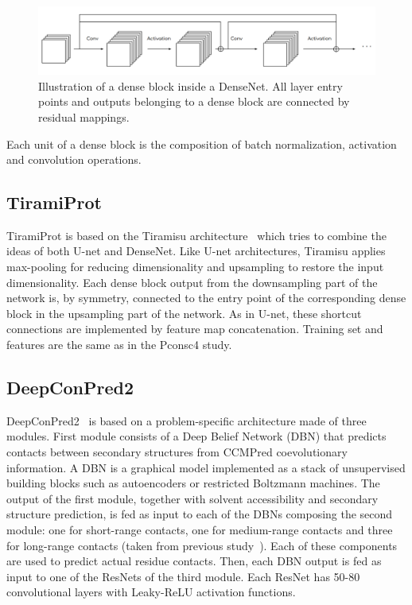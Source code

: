         \begin{figure}[H]
            \begin{center}
                \includegraphics[width=\textwidth, keepaspectratio]{imgs/densenet.png}
                \caption{Illustration of a dense block inside a DenseNet.
                All layer entry points and outputs belonging to a dense block are connected
                by residual mappings.}
                \label{densenet}
            \end{center}
        \end{figure}

        Each unit of a dense block is the composition of batch normalization, activation and
        convolution operations.

    \subsection{TiramiProt}

        TiramiProt is based on the Tiramisu architecture~\cite{TsardakasRenhuldt1228846}
        which tries to combine the ideas of both U-net and DenseNet.
        Like U-net architectures, Tiramisu applies max-pooling for reducing dimensionality
        and upsampling to restore the input dimensionality. Each dense block output from
        the downsampling part of the network is, by symmetry, connected to the entry point
        of the corresponding dense block in the upsampling part of the network.
        As in U-net, these shortcut connections are implemented by feature map concatenation.
        Training set and features are the same as in the Pconsc4 study.

    \subsection{DeepConPred2}

        DeepConPred2~\cite{DeepConPred2} is based on a problem-specific architecture made
        of three modules. First module consists of a Deep Belief Network (DBN) that predicts
        contacts between secondary structures from CCMPred coevolutionary information.
        A DBN is a graphical model implemented as
        a stack of unsupervised building blocks such as autoencoders or
        restricted Boltzmann machines.
        The output of the first module, together with solvent accessibility and secondary
        structure prediction, is fed as input to each of the DBNs composing
        the second module: one for short-range contacts, one for medium-range contacts
        and three for long-range contacts (taken from previous study~\cite{xiong2017deep}).
        Each of these components are used to predict actual residue contacts.
        Then, each DBN output is fed as input to one of the ResNets of the third module.
        Each ResNet has 50-80 convolutional layers with Leaky-ReLU activation functions.

